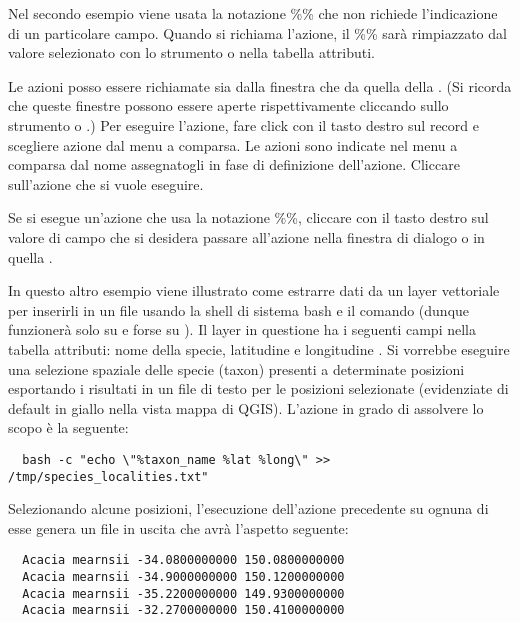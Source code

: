 Nel secondo esempio viene usata la notazione \%\% che non richiede
l'indicazione di un particolare campo. Quando si richiama l'azione, il \%\%
sarà rimpiazzato dal valore selezionato con lo strumento  o nella tabella attributi.

\label{label_usingactions}
Le azioni posso essere richiamate sia dalla finestra  che da quella della . 
(Si ricorda che queste finestre possono essere aperte rispettivamente cliccando sullo
strumento  o
.)
Per eseguire l'azione, fare click con il tasto destro sul record e scegliere
azione dal menu a comparsa. Le azioni sono indicate nel menu a comparsa dal
nome assegnatogli in fase di definizione dell'azione. Cliccare sull'azione che
si vuole eseguire.

Se si esegue un'azione che usa la notazione \%\%, cliccare con il tasto destro
sul valore di campo che si desidera passare all'azione nella finestra di dialogo  o in quella .

In questo altro esempio viene illustrato come estrarre dati da un layer
vettoriale per inserirli in un file usando la shell di sistema bash e il
comando  (dunque funzionerà solo su \nix e forse su \osx). Il
layer in questione ha i seguenti campi nella tabella attributi: nome della
specie, latitudine  e longitudine
. Si vorrebbe eseguire una selezione spaziale delle specie
(taxon) presenti a determinate posizioni esportando i risultati in un file di
testo per le posizioni selezionate (evidenziate di default in giallo nella
vista mappa di QGIS). L'azione in grado di assolvere lo scopo è la seguente:

\begin{verbatim}
  bash -c "echo \"%taxon_name %lat %long\" >> /tmp/species_localities.txt"
\end{verbatim} 

Selezionando alcune posizioni, l'esecuzione dell'azione precedente su ognuna
di esse genera un file in uscita che avrà l'aspetto seguente:

\begin{verbatim}
  Acacia mearnsii -34.0800000000 150.0800000000
  Acacia mearnsii -34.9000000000 150.1200000000
  Acacia mearnsii -35.2200000000 149.9300000000
  Acacia mearnsii -32.2700000000 150.4100000000
\end{verbatim} 

